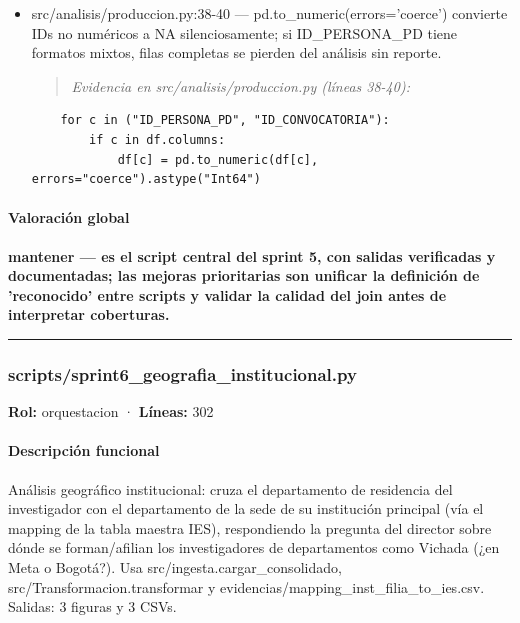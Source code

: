 \begin{tcolorbox}[riesgo]
\begin{itemize}
  \item src/analisis/produccion.py:38-40 --- pd.to\_numeric(errors='coerce') convierte IDs no numéricos a NA silenciosamente; si ID\_PERSONA\_PD tiene formatos mixtos, filas completas se pierden del análisis sin reporte.
\begin{quote}\footnotesize\ttfamily
\noindent\emph{Evidencia en src/analisis/produccion.py (líneas 38-40):}
\end{quote}
\begin{lstlisting}
    for c in ("ID_PERSONA_PD", "ID_CONVOCATORIA"):
        if c in df.columns:
            df[c] = pd.to_numeric(df[c], errors="coerce").astype("Int64")
\end{lstlisting}

\end{itemize}
\end{tcolorbox}

\paragraph{Valoración global}
\textbf{mantener --- es el script central del sprint 5, con salidas verificadas y documentadas; las mejoras prioritarias son unificar la definición de 'reconocido' entre scripts y validar la calidad del join antes de interpretar coberturas.}

\medskip
\hrule

\subsubsection{scripts/sprint6\_geografia\_institucional.py}
\textbf{Rol:} orquestacion · \textbf{Líneas:} 302

\paragraph{Descripción funcional}
Análisis geográfico institucional: cruza el departamento de residencia del investigador con el departamento de la sede de su institución principal (vía el mapping de la tabla maestra IES), respondiendo la pregunta del director sobre dónde se forman/afilian los investigadores de departamentos como Vichada (¿en Meta o Bogotá?). Usa src/ingesta.cargar\_consolidado, src/Transformacion.transformar y evidencias/mapping\_inst\_filia\_to\_ies.csv. Salidas: 3 figuras y 3 CSVs.

